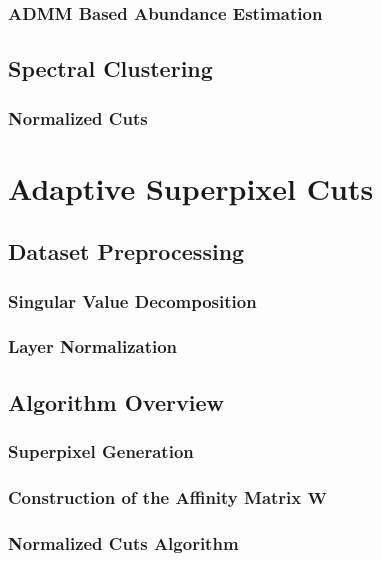 \documentclass[12pt]{article}
\begin{document}
\subsubsection{ADMM Based Abundance Estimation}\label{Block ADMM}

\clearpage
\subsection{Spectral Clustering} \label{Spectral Clustering}
\subsubsection{Normalized Cuts} \label{Normalized Cuts}

\clearpage
% 
% 
% 
% 
% 
\section{Adaptive Superpixel Cuts} \label{Algorithm Intro}

\subsection{Dataset Preprocessing} \label{Algorithm Preprocessing}
\subsubsection{Singular Value Decomposition} \label{SVD}
\subsubsection{Layer Normalization} \label{Normalization}

\clearpage
\subsection{Algorithm Overview} \label{Algorithm Overview}
\subsubsection{Superpixel Generation} \label{Algorithm Superpixels}
\subsubsection{Construction of the Affinity Matrix $\mathbf{W}$}\label{Algorithm Laplacian}
\subsubsection{Normalized Cuts Algorithm}\label{Algorithm Ncuts}
\end{document}
